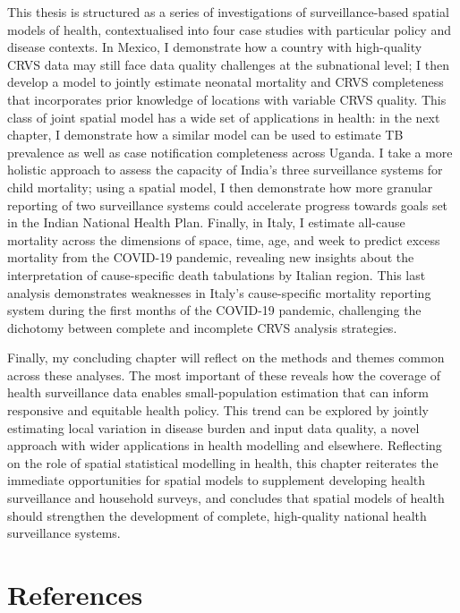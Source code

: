 \documentclass[
]{report}
\begin{document}
This thesis is structured as a series of investigations of surveillance-based spatial models of health, contextualised into four case studies with particular policy and disease contexts. In Mexico, I demonstrate how a country with high-quality CRVS data may still face data quality challenges at the subnational level; I then develop a model to jointly estimate neonatal mortality and CRVS completeness that incorporates prior knowledge of locations with variable CRVS quality. This class of joint spatial model has a wide set of applications in health: in the next chapter, I demonstrate how a similar model can be used to estimate TB prevalence as well as case notification completeness across Uganda. I take a more holistic approach to assess the capacity of India's three surveillance systems for child mortality; using a spatial model, I then demonstrate how more granular reporting of two surveillance systems could accelerate progress towards goals set in the Indian National Health Plan. Finally, in Italy, I estimate all-cause mortality across the dimensions of space, time, age, and week to predict excess mortality from the COVID-19 pandemic, revealing new insights about the interpretation of cause-specific death tabulations by Italian region. This last analysis demonstrates weaknesses in Italy's cause-specific mortality reporting system during the first months of the COVID-19 pandemic, challenging the dichotomy between complete and incomplete CRVS analysis strategies.

Finally, my concluding chapter will reflect on the methods and themes common across these analyses. The most important of these reveals how the coverage of health surveillance data enables small-population estimation that can inform responsive and equitable health policy. This trend can be explored by jointly estimating local variation in disease burden and input data quality, a novel approach with wider applications in health modelling and elsewhere. Reflecting on the role of spatial statistical modelling in health, this chapter reiterates the immediate opportunities for spatial models to supplement developing health surveillance and household surveys, and concludes that spatial models of health should strengthen the development of complete, high-quality national health surveillance systems.

\hypertarget{references}{%
\section{References}\label{references}}
\end{document}

